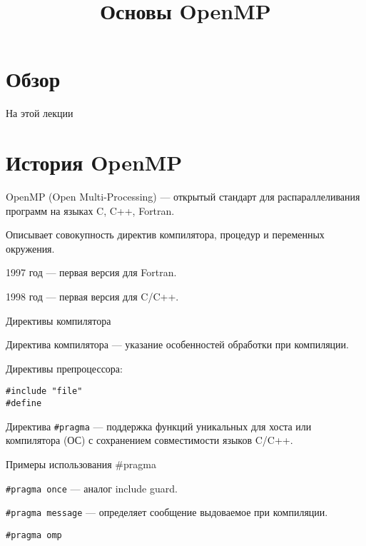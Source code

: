 

\title{Основы OpenMP}



\section*{Обзор}

\begin{frame}
\titlepage
\end{frame} 

\begin{frame}{На этой лекции}
\tableofcontents
\end{frame}


\section{История OpenMP}

\begin{frame}

OpenMP (Open Multi-Processing) --- открытый стандарт для распараллеливания программ на языках C, C++, Fortran.

Описывает совокупность директив компилятора, процедур и переменных окружения.

1997 год --- первая версия для Fortran.

1998 год --- первая версия для C/C++.

\end{frame}

\begin{frame}[fragile]{Директивы компилятора}

Директива компилятора --- указание особенностей обработки при компиляции.

Директивы препроцессора:

\begin{lstlisting}
#include "file"
#define
\end{lstlisting}

Директива \texttt{\#pragma} --- поддержка функций уникальных для хоста или компилятора (ОС) с сохранением совместимости языков C/C++.

\end{frame}

\begin{frame}{Примеры использования \#pragma}

\texttt{\#pragma once} --- аналог include guard.

\texttt{\#pragma message} --- определяет сообщение выдоваемое при компиляции.

\texttt{\#pragma omp}

\end{frame}

